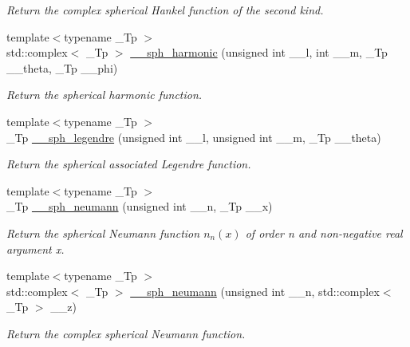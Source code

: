 \begin{DoxyCompactItemize}
\begin{DoxyCompactList}\small\item\em Return the complex spherical Hankel function of the second kind. \end{DoxyCompactList}\item 
{\footnotesize template$<$typename \+\_\+\+Tp $>$ }\\std\+::complex$<$ \+\_\+\+Tp $>$ \hyperlink{namespacestd_1_1____detail_a31b9beb882431d61d439862de0366eec}{\+\_\+\+\_\+sph\+\_\+harmonic} (unsigned int \+\_\+\+\_\+l, int \+\_\+\+\_\+m, \+\_\+\+Tp \+\_\+\+\_\+theta, \+\_\+\+Tp \+\_\+\+\_\+phi)
\begin{DoxyCompactList}\small\item\em Return the spherical harmonic function. \end{DoxyCompactList}\item 
{\footnotesize template$<$typename \+\_\+\+Tp $>$ }\\\+\_\+\+Tp \hyperlink{namespacestd_1_1____detail_a1c819d02915bdc2ab5c7693513ce0be0}{\+\_\+\+\_\+sph\+\_\+legendre} (unsigned int \+\_\+\+\_\+l, unsigned int \+\_\+\+\_\+m, \+\_\+\+Tp \+\_\+\+\_\+theta)
\begin{DoxyCompactList}\small\item\em Return the spherical associated Legendre function. \end{DoxyCompactList}\item 
{\footnotesize template$<$typename \+\_\+\+Tp $>$ }\\\+\_\+\+Tp \hyperlink{namespacestd_1_1____detail_a94ac68003333b86b157a3b1e6ce44830}{\+\_\+\+\_\+sph\+\_\+neumann} (unsigned int \+\_\+\+\_\+n, \+\_\+\+Tp \+\_\+\+\_\+x)
\begin{DoxyCompactList}\small\item\em Return the spherical Neumann function $ n_n(x) $ of order n and non-\/negative real argument {\ttfamily x}. \end{DoxyCompactList}\item 
{\footnotesize template$<$typename \+\_\+\+Tp $>$ }\\std\+::complex$<$ \+\_\+\+Tp $>$ \hyperlink{namespacestd_1_1____detail_ac72e28d4d5fb8b0ffa033b9a47b67a8e}{\+\_\+\+\_\+sph\+\_\+neumann} (unsigned int \+\_\+\+\_\+n, std\+::complex$<$ \+\_\+\+Tp $>$ \+\_\+\+\_\+z)
\begin{DoxyCompactList}\small\item\em Return the complex spherical Neumann function. \end{DoxyCompactList}\item 

\end{DoxyCompactItemize}
